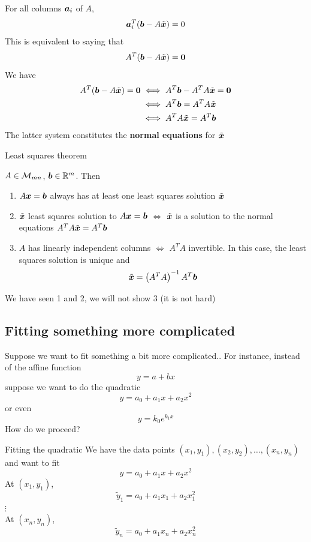 \documentclass[aspectratio=169]{beamer}
\begin{document}
\begin{frame}
For all columns $\bm{a}_i$ of $A$,
\[\bm{a}_i^T(\bm{b}-A\tilde{\bm{x}}) = 0
\]
\vfill
This is equivalent to saying that
\[
A^T(\bb-A\tilde\bx) = \b0
\]
\vfill
We have
\begin{align*}
A^T(\bb-A\tilde\bx) = \b0 &\iff A^T\bb - A^TA\tilde\bx = \b0 \\
&\iff A^T\bb = A^TA\tilde\bx \\
&\iff A^TA\tilde\bx = A^T\bb
\end{align*}
The latter system constitutes the \textbf{normal equations} for $\tilde{\bm{x}}$
\end{frame}


\begin{frame}{Least squares theorem}
\begin{importanttheorem}\label{th:least_squares}
$A\in\mathcal{M}_{mn}$, $\bm{b}\in\mathbb{R}^m$. Then
\begin{enumerate}
\item $A\bm{x}=\bm{b}$ always has at least one least squares solution $\tilde{\bm{x}}$
\item $\tilde{\bm{x}}$ least squares solution to $A\bm{x}=\bm{b}$ $\iff$ $\tilde{\bm{x}}$ is a solution to the normal equations $A^TA\tilde{\bm{x}} = A^T\bm{b}$
\item $A$ has linearly independent columns $\iff$ $A^TA$ invertible.  
\newline In this case, the least squares solution is unique and 
\[
\tilde{\bm{x}} = \left(A^TA\right)^{-1}A^T\bm{b}
\]
\end{enumerate}
\end{importanttheorem}
\vfill
We have seen 1 and 2, we will not show 3 (it is not hard)
\end{frame}


\subsection{Fitting something more complicated}

\begin{frame}{Suppose we want to fit something a bit more complicated..}
For instance, instead of the affine function
\[
y = a+bx
\]
suppose we want to do the quadratic
\[
y = a_0+a_1x+a_2x^2
\]
or even
\[
y = k_0 e^{k_1x}
\]
\vfill
How do we proceed?
\end{frame}


\begin{frame}{Fitting the quadratic}
We have the data points $(x_1,y_1),(x_2,y_2),\ldots,(x_n,y_n)$ and want to fit
\[
y = a_0+a_1x+a_2x^2
\]
At $(x_1,y_1)$,
\[
\tilde y_1 = a_0+a_1x_1+a_2x_1^2
\]
$\vdots$\\
At $(x_n,y_n)$,
\[
\tilde y_n = a_0+a_1x_n+a_2x_n^2
\]
\end{frame}
\end{document}
